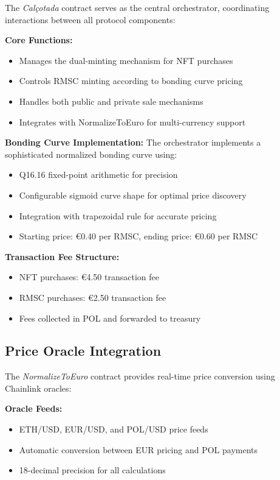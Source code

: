 \documentclass[conference]{IEEEtran}
\begin{document}
The \textit{Calçotada} contract serves as the central orchestrator, coordinating interactions between all protocol components:

\textbf{Core Functions:}
\begin{itemize}
    \item Manages the dual-minting mechanism for NFT purchases
    \item Controls RMSC minting according to bonding curve pricing
    \item Handles both public and private sale mechanisms
    \item Integrates with NormalizeToEuro for multi-currency support
\end{itemize}

\textbf{Bonding Curve Implementation:}
The orchestrator implements a sophisticated normalized bonding curve using:
\begin{itemize}
    \item Q16.16 fixed-point arithmetic for precision
    \item Configurable sigmoid curve shape for optimal price discovery
    \item Integration with trapezoidal rule for accurate pricing
    \item Starting price: €0.40 per RMSC, ending price: €0.60 per RMSC
\end{itemize}

\textbf{Transaction Fee Structure:}
\begin{itemize}
    \item NFT purchases: €4.50 transaction fee
    \item RMSC purchases: €2.50 transaction fee
    \item Fees collected in POL and forwarded to treasury
\end{itemize}

\subsection{Price Oracle Integration}

The \textit{NormalizeToEuro} contract provides real-time price conversion using Chainlink oracles:

\textbf{Oracle Feeds:}
\begin{itemize}
    \item ETH/USD, EUR/USD, and POL/USD price feeds
    \item Automatic conversion between EUR pricing and POL payments
    \item 18-decimal precision for all calculations
\end{itemize}
\end{document}
